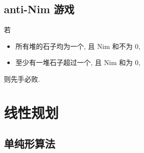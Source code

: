 \documentclass[UTF8, a4paper, titlepage, twoside]{ctexart}
\begin{document}
\subsection{ anti-Nim 游戏 }
若
\begin{itemize}
	\item 所有堆的石子均为一个, 且 Nim 和不为 0,
	\item 至少有一堆石子超过一个, 且 Nim 和为 0,
\end{itemize}
则先手必败.

\newpage
\section{ 线性规划 }
\subsection{ 单纯形算法 }
\end{document}
